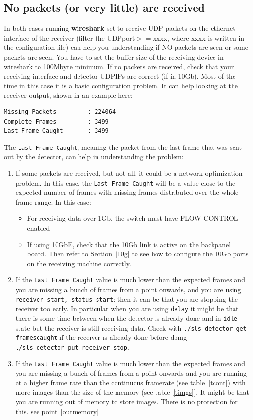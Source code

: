 \documentclass{article}
\begin{document}
{{{\subsection{No packets (or very little) are received} 
In both cases running \textbf{wireshark} set to receive UDP packets on the ethernet interface of the receiver (filter the UDPport$>=$xxxx, where xxxx is written in the configuration file) can help you understanding if NO packets are seen or some packets are seen. You have to set the buffer size of the receiving device in wireshark to 100Mbyte minimum. If no packets are received, check that your receiving interface and detector UDPIPs are correct (if in 10Gb). Most of the time in this case it is a basic configuration problem.
It can help looking at the receiver output, shown in an example here:
\begin{verbatim}
Missing Packets         : 224064
Complete Frames         : 3499
Last Frame Caught       : 3499
\end{verbatim}

The {\tt{Last Frame Caught}}, meaning the packet from the last frame that was sent out by the detector, can help in understanding the problem: 
\begin{enumerate}
\item If some packets are received, but not all, it could be a network optimization problem. In this case, the {\tt{Last Frame Caught}} will be a value close to the expected number of frames with missing frames distributed over the whole frame range. In this case: 
 \begin{itemize}
\item For receiving data over 1Gb, the switch must have FLOW CONTROL enabled 
\item If using 10GbE, check that the 10Gb link is active on the backpanel board. Then refer to Section~\ref{10g} to see how to configure the 10Gb ports on the receiving machine correctly. 
\end{itemize}
\item If the {\tt{Last Frame Caught}} value is much lower than the expected frames and you are missing a bunch of frames from a point onwards, and you are using {\tt{receiver start, status start}}: then it can be that you are stopping the receiver too early. In particular when you are using {\tt{delay}} it might be that there is some time between when the detector is already done and in {\tt{idle}} state but the receiver is still receiving data. Check with {\tt{./sls\_detector\_get framescaught}} if the receiver is already done before doing {\tt{./sls\_detector\_put receiver stop}}.   
\item If the {\tt{Last Frame Caught}} value is much lower than the expected frames and you are missing a bunch of frames from a point onwards and you are running at a higher frame rate than the continuous framerate (see table~\ref{tcont}) with more images than the size of the memory (see table~\ref{timgs}). It might be that you are running out of memory to store images. There is no protection for this. see point~\ref{outmemory}
 \end{enumerate}

}}}
\end{document}
